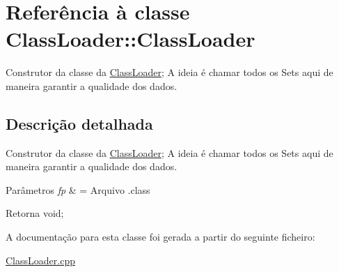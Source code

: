 \hypertarget{class_class_loader_1_1_class_loader}{}\section{Referência à classe Class\+Loader\+:\+:Class\+Loader}
\label{class_class_loader_1_1_class_loader}


Construtor da classe da \hyperlink{class_class_loader_1_1_class_loader}{Class\+Loader}; A ideia é chamar todos os Set\textquotesingle{}s aqui de maneira garantir a qualidade dos dados.  




\subsection{Descrição detalhada}
Construtor da classe da \hyperlink{class_class_loader_1_1_class_loader}{Class\+Loader}; A ideia é chamar todos os Set\textquotesingle{}s aqui de maneira garantir a qualidade dos dados. 


\begin{DoxyParams}{Parâmetros}
{\em fp} & = Arquivo .class \\
\hline
\end{DoxyParams}
\begin{DoxyReturn}{Retorna}
void; 
\end{DoxyReturn}


A documentação para esta classe foi gerada a partir do seguinte ficheiro\+:\begin{DoxyCompactItemize}
\item 
\hyperlink{_class_loader_8cpp}{Class\+Loader.\+cpp}\end{DoxyCompactItemize}

